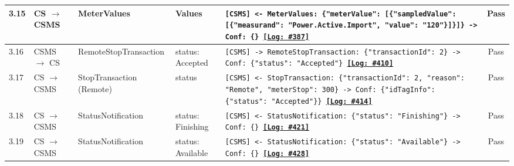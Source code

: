 \documentclass[10pt, a4paper, landscape]{article}
\begin{document}
\begin{longtable}{|p{1.0cm}|p{2.5cm}|p{4.0cm}|p{5.0cm}|p{10.0cm}|c|}
\hline
3.15 & CS $\to$ CSMS & MeterValues & Values & \footnotesize\texttt{[CSMS] <- MeterValues: \{"meterValue": [\{"sampledValue": [\{"measurand": "Power.Active.Import", "value": "120"\}]\}]\} \newline [CSMS] -> Conf: \{\} \newline \hyperref[log:3.15]{\textbf{[Log: \#387]}}} & Pass \\
\hline
3.16 & CSMS $\to$ CS & RemoteStopTransaction & status: Accepted & \footnotesize\texttt{[CSMS] -> RemoteStopTransaction: \{"transactionId": 2\} \newline [CS] -> Conf: \{"status": "Accepted"\} \newline \hyperref[log:3.16]{\textbf{[Log: \#410]}}} & Pass \\
\hline
3.17 & CS $\to$ CSMS & StopTransaction (Remote) & status & \footnotesize\texttt{[CSMS] <- StopTransaction: \{"transactionId": 2, "reason": "Remote", "meterStop": 300\} \newline [CSMS] -> Conf: \{"idTagInfo": \{"status": "Accepted"\}\} \newline \hyperref[log:3.17]{\textbf{[Log: \#414]}}} & Pass \\
\hline
3.18 & CS $\to$ CSMS & StatusNotification & status: Finishing & \footnotesize\texttt{[CSMS] <- StatusNotification: \{"status": "Finishing"\} \newline [CSMS] -> Conf: \{\} \newline \hyperref[log:3.18]{\textbf{[Log: \#421]}}} & Pass \\
\hline
3.19 & CS $\to$ CSMS & StatusNotification & status: Available & \footnotesize\texttt{[CSMS] <- StatusNotification: \{"status": "Available"\} \newline [CSMS] -> Conf: \{\} \newline \hyperref[log:3.19]{\textbf{[Log: \#428]}}} & Pass \\
\hline


\end{longtable}
\end{document}
